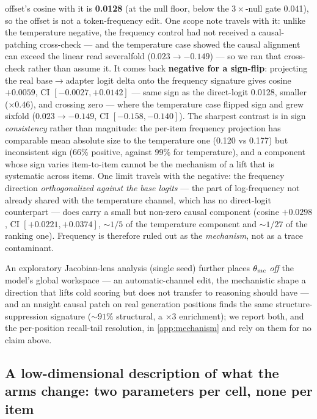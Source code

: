 offset's cosine with it is \textbf{0.0128} (at the null floor, below the
$3\times$-null gate 0.041), so the offset is not a token-frequency edit. One scope
note travels with it: unlike the temperature negative, the frequency control had
not received a causal-patching cross-check --- and the temperature case showed the
causal alignment can exceed the linear read severalfold
($0.023 \rightarrow -0.149$) --- so we ran that cross-check rather than assume it.
It comes back \textbf{negative for a sign-flip}: projecting the real
base${\rightarrow}$adapter logit delta onto the frequency signature gives cosine
$\mathbf{+0.0059}$, CI $[-0.0027, +0.0142]$ --- same sign as the direct-logit
0.0128, smaller ($\times0.46$), and crossing zero --- where the temperature case
flipped sign and grew sixfold ($0.023 \rightarrow -0.149$, CI $[-0.158, -0.140]$).
The sharpest contrast is in sign \emph{consistency} rather than magnitude: the
per-item frequency projection has comparable mean absolute size to the temperature
one (0.120 vs 0.177) but inconsistent sign (66\% positive, against 99\% for
temperature), and a component whose sign varies item-to-item cannot be the
mechanism of a lift that is systematic across items. One limit travels with the
negative: the frequency direction \emph{orthogonalized against the base logits} ---
the part of log-frequency not already shared with the temperature channel, which
has no direct-logit counterpart --- does carry a small but non-zero causal
component (cosine $\mathbf{+0.0298}$, CI $[+0.0221, +0.0374]$, ${\sim}1/5$ of the
temperature component and ${\sim}1/27$ of the ranking one). Frequency is therefore
ruled out as the \emph{mechanism}, not as a trace contaminant.

An exploratory Jacobian-lens analysis (single seed) further places $\theta_{\mathrm{mc}}$
\emph{off} the model's global workspace --- an automatic-channel edit, the
mechanistic shape a direction that lifts cold scoring but does not transfer to
reasoning should have --- and an nnsight causal patch on real generation positions
finds the same structure-suppression signature (${\sim}91\%$ structural, a
$\times3$ enrichment); we report both, and the per-position recall-tail resolution,
in \cref{app:mechanism} and rely on them for no claim above.

\subsection{A low-dimensional description of what the arms change: two parameters per
cell, none per item}\label{disc:mechanism}

